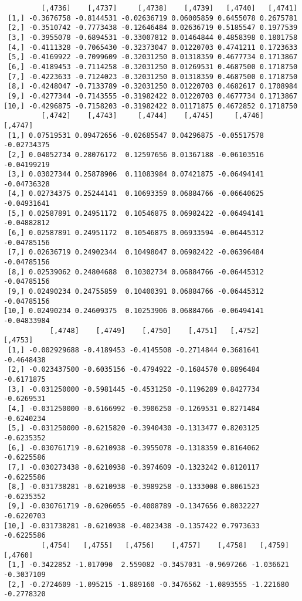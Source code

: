 \documentclass[
  letterpaper,
  DIV=11,
  numbers=noendperiod]{scrreprt}
\begin{document}
\begin{verbatim}
         [,4736]    [,4737]     [,4738]    [,4739]   [,4740]   [,4741]
 [1,] -0.3676758 -0.8144531 -0.02636719 0.06005859 0.6455078 0.2675781
 [2,] -0.3510742 -0.7773438 -0.12646484 0.02636719 0.5185547 0.1977539
 [3,] -0.3955078 -0.6894531 -0.33007812 0.01464844 0.4858398 0.1801758
 [4,] -0.4111328 -0.7065430 -0.32373047 0.01220703 0.4741211 0.1723633
 [5,] -0.4169922 -0.7099609 -0.32031250 0.01318359 0.4677734 0.1713867
 [6,] -0.4189453 -0.7114258 -0.32031250 0.01269531 0.4687500 0.1718750
 [7,] -0.4223633 -0.7124023 -0.32031250 0.01318359 0.4687500 0.1718750
 [8,] -0.4248047 -0.7133789 -0.32031250 0.01220703 0.4682617 0.1708984
 [9,] -0.4277344 -0.7143555 -0.31982422 0.01220703 0.4677734 0.1713867
[10,] -0.4296875 -0.7158203 -0.31982422 0.01171875 0.4672852 0.1718750
         [,4742]    [,4743]     [,4744]    [,4745]     [,4746]     [,4747]
 [1,] 0.07519531 0.09472656 -0.02685547 0.04296875 -0.05517578 -0.02734375
 [2,] 0.04052734 0.28076172  0.12597656 0.01367188 -0.06103516 -0.04199219
 [3,] 0.03027344 0.25878906  0.11083984 0.07421875 -0.06494141 -0.04736328
 [4,] 0.02734375 0.25244141  0.10693359 0.06884766 -0.06640625 -0.04931641
 [5,] 0.02587891 0.24951172  0.10546875 0.06982422 -0.06494141 -0.04882812
 [6,] 0.02587891 0.24951172  0.10546875 0.06933594 -0.06445312 -0.04785156
 [7,] 0.02636719 0.24902344  0.10498047 0.06982422 -0.06396484 -0.04785156
 [8,] 0.02539062 0.24804688  0.10302734 0.06884766 -0.06445312 -0.04785156
 [9,] 0.02490234 0.24755859  0.10400391 0.06884766 -0.06445312 -0.04785156
[10,] 0.02490234 0.24609375  0.10253906 0.06884766 -0.06494141 -0.04833984
           [,4748]    [,4749]    [,4750]    [,4751]   [,4752]    [,4753]
 [1,] -0.002929688 -0.4189453 -0.4145508 -0.2714844 0.3681641 -0.4648438
 [2,] -0.023437500 -0.6035156 -0.4794922 -0.1684570 0.8896484 -0.6171875
 [3,] -0.031250000 -0.5981445 -0.4531250 -0.1196289 0.8427734 -0.6269531
 [4,] -0.031250000 -0.6166992 -0.3906250 -0.1269531 0.8271484 -0.6240234
 [5,] -0.031250000 -0.6215820 -0.3940430 -0.1313477 0.8203125 -0.6235352
 [6,] -0.030761719 -0.6210938 -0.3955078 -0.1318359 0.8164062 -0.6225586
 [7,] -0.030273438 -0.6210938 -0.3974609 -0.1323242 0.8120117 -0.6225586
 [8,] -0.031738281 -0.6210938 -0.3989258 -0.1333008 0.8061523 -0.6235352
 [9,] -0.030761719 -0.6206055 -0.4008789 -0.1347656 0.8032227 -0.6220703
[10,] -0.031738281 -0.6210938 -0.4023438 -0.1357422 0.7973633 -0.6225586
         [,4754]   [,4755]   [,4756]    [,4757]    [,4758]   [,4759]    [,4760]
 [1,] -0.3422852 -1.017090  2.559082 -0.3457031 -0.9697266 -1.036621 -0.3037109
 [2,] -0.2724609 -1.095215 -1.889160 -0.3476562 -1.0893555 -1.221680 -0.2778320

\end{verbatim}
\end{document}
